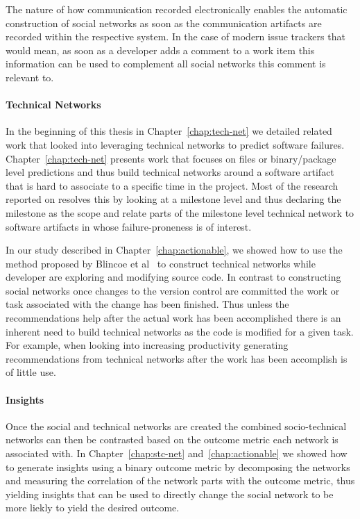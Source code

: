 The nature of how communication recorded electronically enables the automatic construction of social networks as soon as the communication artifacts are recorded within the respective system.
In the case of modern issue trackers that would mean, as soon as a developer adds a comment to a work item this information can be used to complement all social networks this comment is relevant to.

\paragraph{Technical Networks}
In the beginning of this thesis in Chapter~\ref{chap:tech-net} we detailed related work that looked into leveraging technical networks to predict software failures.
Chapter~\ref{chap:tech-net} presents work that focuses on files or binary/package level predictions and thus build technical networks around a software artifact that is hard to associate to a specific time in the project.
Most of the research reported on resolves this by looking at a milestone level and thus declaring the milestone as the scope and relate parts of the milestone level technical network to software artifacts in whose failure-proneness is of interest.

In our study described in Chapter~\ref{chap:actionable}, we showed how to use the method proposed by Blincoe et al~\cite{blincoe:cscw:2012} to construct technical networks while developer are exploring and modifying source code.
In contrast to constructing social networks once changes to the version control are committed the work or task associated with the change has been finished.
Thus unless the recommendations help after the actual work has been accomplished there is an inherent need to build technical networks as the code is modified for a given task.
For example, when looking into increasing productivity generating recommendations from technical networks after the work has been accomplish is of little use.

\paragraph{Insights}
Once the social and technical networks are created the combined socio-technical networks can then be contrasted based on the outcome metric each network is associated with.
In Chapter~\ref{chap:stc-net} and~\ref{chap:actionable} we showed how to generate insights using a binary outcome metric by decomposing the networks and measuring the correlation of the network parts with the outcome metric, thus yielding insights that can be used to directly change the social network to be more liekly to yield the desired outcome.

